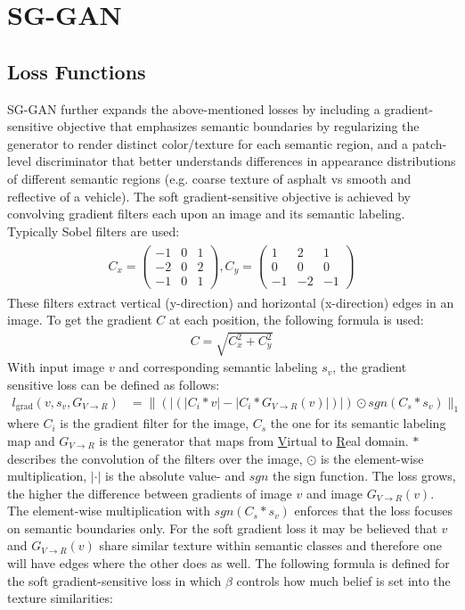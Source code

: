 \section{SG-GAN}

\subsection{Loss Functions}
SG-GAN \cite{DBLP:journals/corr/abs-1801-01726} further expands the above-mentioned losses by including a gradient-sensitive objective that emphasizes semantic boundaries by regularizing the generator to render distinct color/texture for each semantic region, and a patch-level discriminator that better understands differences in appearance distributions of different semantic regions (e.g. coarse texture of asphalt vs smooth and reflective of a vehicle). The soft gradient-sensitive objective is achieved by convolving gradient filters each upon an image and its semantic labeling. Typically Sobel filters are used:
\begin{align}
	\begin{array}{cc}
		C_x = 
		\begin{pmatrix}
			-1 & 0 & 1\\
			-2 & 0 & 2\\
			-1 & 0 & 1
		\end{pmatrix},
		C_y = 
		\begin{pmatrix}
			1 & 2 & 1\\
			0 & 0 & 0\\
			-1 & -2 & -1
		\end{pmatrix}
	\end{array}
	\label{eq:sobel}
\end{align}
These filters extract vertical (y-direction) and horizontal (x-direction) edges in an image. To get the gradient $C$ at each position, the following formula is used:
\begin{align}
	C = \sqrt{C_x^2 + C_y^2}
\end{align}
With input image $v$ and corresponding semantic labeling $s_v$, the gradient sensitive loss can be defined as follows:
\begin{align}
		l_{\text{grad}}(v,s_v,G_{V\rightarrow R}) &= \lVert(|(|C_i * v |-|C_i*G_{V\rightarrow R}(v)|)|) \odot sgn(C_s*s_v)\rVert_1
\end{align}
where $C_i$ is the gradient filter for the image, $C_s$ the one for its semantic labeling map and $G_{V\rightarrow R}$ is the generator that maps from \underline{V}irtual to \underline{R}eal domain. $*$ describes the convolution of the filters over the image, $\odot$ is the element-wise multiplication, $|\cdot|$ is the absolute value- and $sgn$ the sign function. The loss grows, the higher the difference between gradients of image $v$ and image $G_{V\rightarrow R}(v)$. The element-wise multiplication with $sgn(C_s * s_v)$ enforces that the loss focuses on semantic boundaries only. For the soft gradient loss it may be believed that $v$ and $G_{V\rightarrow R}(v)$ share similar texture within semantic classes and therefore one will have edges where the other does as well. The following formula is defined for the soft gradient-sensitive loss in which $\beta$ controls how much belief is set into the texture similarities:
